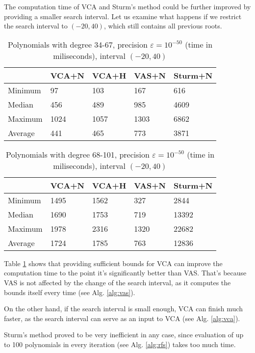 \documentclass[
  digital, %
  notable,   %
  nolof,     %
  nolot,     %
	final, %
]{fithesis3}
\begin{document}
The computation time of VCA and Sturm's method could be further improved by providing a smaller search interval. Let us examine what happens if we restrict the search interval to $(-20,40)$, which still contains all previous roots.

\begin{table}
  \begin{tabular*}{\textwidth}{lllll}
    \toprule
     & VCA+N & VCA+H & VAS+N & Sturm+N \\
    \midrule
			Minimum & 97 & 103 & 167 & 616 \\
			Median & 456 & 489 & 985 & 4609 \\
			Maximum & 1024 & 1057 & 1303 & 6862 \\
			Average & 441 & 465 & 773 & 3871 \\
    \bottomrule
  \end{tabular*}
  \caption{Polynomials with degree 34-67, precision $\varepsilon = 10^{-50}$ (time in miliseconds), interval $(-20,40)$}
  \label{tab:coa5}
\end{table}

\begin{table}
  \begin{tabular*}{\textwidth}{lllll}
    \toprule
     & VCA+N & VCA+H & VAS+N & Sturm+N \\
    \midrule
			Minimum & 1495 & 1562 & 327 & 2844 \\
			Median & 1690 & 1753 & 719 & 13392 \\
			Maximum & 1978 & 2316 & 1320 & 22682 \\
			Average & 1724 & 1785 & 763 & 12836 \\
    \bottomrule
  \end{tabular*}
  \caption{Polynomials with degree 68-101, precision $\varepsilon = 10^{-50}$ (time in miliseconds), interval $(-20,40)$}
  \label{tab:coa6}
\end{table}

Table \ref{tab:coa5} shows that providing sufficient bounds for VCA can improve the computation time to the point it's significantly better than VAS. That's because VAS is not affected by the change of the search interval, as it computes the bounds itself every time (see Alg. \ref{alg:vas}).

On the other hand, if the search interval is small enough, VCA can finish much faster, as the search interval can serve as an input to VCA (see Alg. \ref{alg:vca}).

Sturm's method proved to be very inefficient in any case, since evaluation of up to 100 polynomials in every iteration (see Alg. \ref{alg:rfs}) takes too much time.
\end{document}
